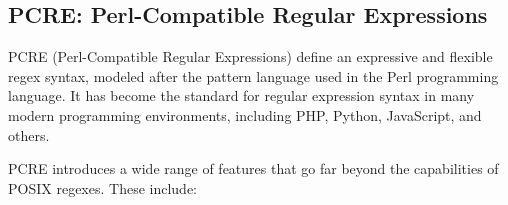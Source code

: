 %
%
%

\subsection{PCRE: Perl-Compatible Regular Expressions}

PCRE (Perl-Compatible Regular Expressions) define an expressive and flexible regex syntax, modeled after the pattern language used in the Perl programming language. It has become the standard for regular expression syntax in many modern programming environments, including PHP, Python, JavaScript, and others.

PCRE introduces a wide range of features that go far beyond the capabilities of POSIX regexes. These include:

